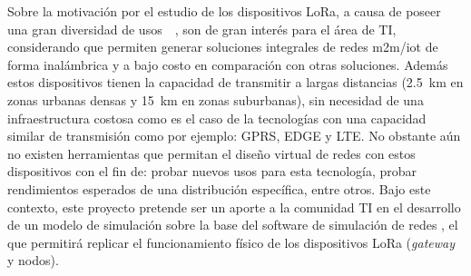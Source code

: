\begin{justify}
Sobre la motivación por el estudio de los dispositivos LoRa, a causa de poseer una gran diversidad de usos~\cite{use1}~\cite{use2}, son de gran interés para el área de TI, considerando que permiten generar soluciones integrales de redes \gls{m2m}/\gls{iot} de forma inalámbrica y a bajo costo en comparación con otras soluciones. Además estos dispositivos tienen la capacidad de transmitir a largas distancias (\SI{2.5}{\kilo\meter} en zonas urbanas densas y \SI{15}{\kilo\meter} en zonas suburbanas), sin necesidad de una infraestructura costosa como es el caso de la tecnologías con una capacidad similar de transmisión como por ejemplo: GPRS, EDGE y LTE. No obstante aún no existen herramientas que permitan el diseño virtual de redes con estos dispositivos con el fin de: probar nuevos usos para esta tecnología, probar rendimientos esperados de una distribución específica, entre otros. Bajo este contexto, este proyecto pretende ser un aporte a la comunidad TI en el desarrollo de un modelo de simulación sobre la base del software de simulación de redes \OMNET, el que permitirá replicar el funcionamiento físico de los dispositivos LoRa (\textit{gateway} y nodos).

\end{justify}
